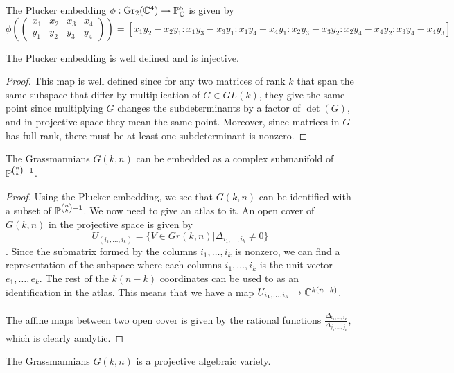 \documentclass[a4paper]{article}
\begin{document}
\begin{eg}{}{} The Plucker embedding $\phi:\text{Gr}_2(\mathbb{C}^4)\to\mathbb{P}_{\mathbb{C}}^5$ is given by $$\phi\left(\begin{pmatrix}
x_1 & x_2 & x_3 & x_4\\
y_1 & y_2 & y_3 & y_4
\end{pmatrix}\right)=[x_1y_2-x_2y_1:x_1y_3-x_3y_1:x_1y_4-x_4y_1:x_2y_3-x_3y_2:x_2y_4-x_4y_2:x_3y_4-x_4y_3]$$
\end{eg}

\begin{prp}{}{} The Plucker embedding is well defined and is injective. \tcbline
\begin{proof}
This map is well defined since for any two matrices of rank $k$ that span the same subspace that differ by multiplication of $G\in GL(k)$, they give the same point since multiplying $G$ changes the subdeterminants by a factor of $\det(G)$, and in projective space they mean the same point. Moreover, since matrices in $G$ has full rank, there must be at least one subdeterminant is nonzero. 
\end{proof}
\end{prp}

\begin{thm}{}{} The Grassmannians $G(k,n)$ can be embedded as a complex submanifold of $\mathbb{P}^{\binom{n}{k}-1}$. \tcbline
\begin{proof}
Using the Plucker embedding, we see that $G(k,n)$ can be identified with a subset of $\mathbb{P}^{\binom{n}{k}-1}$. We now need to give an atlas to it. An open cover of $G(k,n)$ in the projective space is given by $$U_{(i_1,\dots,i_k)}=\{V\in Gr(k,n)|\Delta_{i_1,\dots,i_k}\neq 0\}$$. Since the submatrix formed by the columns $i_1,\dots,i_k$ is nonzero, we can find a representation of the subspace where each columns $i_1,\dots,i_k$ is the unit vector $e_1,\dots,e_k$. The rest of the $k(n-k)$ coordinates can be used to as an identification in the atlas. This means that we have a map $U_{i_1,\dots,i_k}\to\mathbb{C}^{k(n-k)}$. \\~\\
The affine maps between two open cover is given by the rational functions $\frac{\Delta_{i_1,\dots,i_k}}{\Delta_{j_1,\dots,j_k}}$, which is clearly analytic. 
\end{proof}
\end{thm}

\begin{thm}{}{} The Grassmannians $G(k,n)$ is a projective algebraic variety. 
\end{thm}
\end{document}
